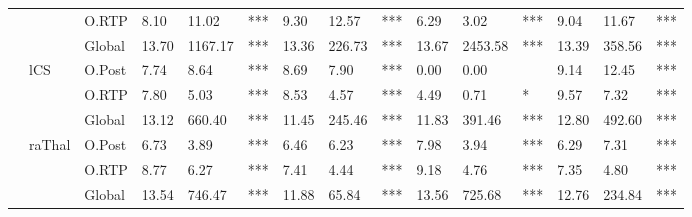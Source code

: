 \begin{tabular}{llllll|lll|lll|lll}
 &  & \multicolumn{1}{l|}{O.RTP} & 8.10 & 11.02 & *** & 9.30 & 12.57 & *** & 6.29 & 3.02 & *** & 9.04 & 11.67 & *** \\
 & \cellcolor[HTML]{EFEFEF} & \multicolumn{1}{l|}{\cellcolor[HTML]{EFEFEF}Global} & \cellcolor[HTML]{EFEFEF}13.70 & \cellcolor[HTML]{EFEFEF}1167.17 & \cellcolor[HTML]{EFEFEF}*** & \cellcolor[HTML]{EFEFEF}13.36 & \cellcolor[HTML]{EFEFEF}226.73 & \cellcolor[HTML]{EFEFEF}*** & \cellcolor[HTML]{EFEFEF}13.67 & \cellcolor[HTML]{EFEFEF}2453.58 & \cellcolor[HTML]{EFEFEF}*** & \cellcolor[HTML]{EFEFEF}13.39 & \cellcolor[HTML]{EFEFEF}358.56 & \cellcolor[HTML]{EFEFEF}*** \\
 & \cellcolor[HTML]{EFEFEF}lCS & \multicolumn{1}{l|}{\cellcolor[HTML]{C0C0C0}O.Post} & \cellcolor[HTML]{C0C0C0}7.74 & \cellcolor[HTML]{C0C0C0}8.64 & \cellcolor[HTML]{C0C0C0}*** & \cellcolor[HTML]{C0C0C0}8.69 & \cellcolor[HTML]{C0C0C0}7.90 & \cellcolor[HTML]{C0C0C0}*** & \cellcolor[HTML]{C0C0C0}0.00 & \cellcolor[HTML]{C0C0C0}0.00 & \cellcolor[HTML]{C0C0C0} & \cellcolor[HTML]{C0C0C0}9.14 & \cellcolor[HTML]{C0C0C0}12.45 & \cellcolor[HTML]{C0C0C0}*** \\
 & \cellcolor[HTML]{EFEFEF} & \multicolumn{1}{l|}{\cellcolor[HTML]{EFEFEF}O.RTP} & \cellcolor[HTML]{EFEFEF}7.80 & \cellcolor[HTML]{EFEFEF}5.03 & \cellcolor[HTML]{EFEFEF}*** & \cellcolor[HTML]{EFEFEF}8.53 & \cellcolor[HTML]{EFEFEF}4.57 & \cellcolor[HTML]{EFEFEF}*** & \cellcolor[HTML]{EFEFEF}4.49 & \cellcolor[HTML]{EFEFEF}0.71 & \cellcolor[HTML]{EFEFEF}* & \cellcolor[HTML]{EFEFEF}9.57 & \cellcolor[HTML]{EFEFEF}7.32 & \cellcolor[HTML]{EFEFEF}*** \\
 &  & \multicolumn{1}{l|}{Global} & 13.12 & 660.40 & *** & 11.45 & 245.46 & *** & 11.83 & 391.46 & *** & 12.80 & 492.60 & *** \\
 & raThal & \multicolumn{1}{l|}{\cellcolor[HTML]{C0C0C0}O.Post} & \cellcolor[HTML]{C0C0C0}6.73 & \cellcolor[HTML]{C0C0C0}3.89 & \cellcolor[HTML]{C0C0C0}*** & \cellcolor[HTML]{C0C0C0}6.46 & \cellcolor[HTML]{C0C0C0}6.23 & \cellcolor[HTML]{C0C0C0}*** & \cellcolor[HTML]{C0C0C0}7.98 & \cellcolor[HTML]{C0C0C0}3.94 & \cellcolor[HTML]{C0C0C0}*** & \cellcolor[HTML]{C0C0C0}6.29 & \cellcolor[HTML]{C0C0C0}7.31 & \cellcolor[HTML]{C0C0C0}*** \\
 &  & \multicolumn{1}{l|}{O.RTP} & 8.77 & 6.27 & *** & 7.41 & 4.44 & *** & 9.18 & 4.76 & *** & 7.35 & 4.80 & *** \\
 & \cellcolor[HTML]{EFEFEF} & \multicolumn{1}{l|}{\cellcolor[HTML]{EFEFEF}Global} & \cellcolor[HTML]{EFEFEF}13.54 & \cellcolor[HTML]{EFEFEF}746.47 & \cellcolor[HTML]{EFEFEF}*** & \cellcolor[HTML]{EFEFEF}11.88 & \cellcolor[HTML]{EFEFEF}65.84 & \cellcolor[HTML]{EFEFEF}*** & \cellcolor[HTML]{EFEFEF}13.56 & \cellcolor[HTML]{EFEFEF}725.68 & \cellcolor[HTML]{EFEFEF}*** & \cellcolor[HTML]{EFEFEF}12.76 & \cellcolor[HTML]{EFEFEF}234.84 & \cellcolor[HTML]{EFEFEF}*** \\

\end{tabular}
